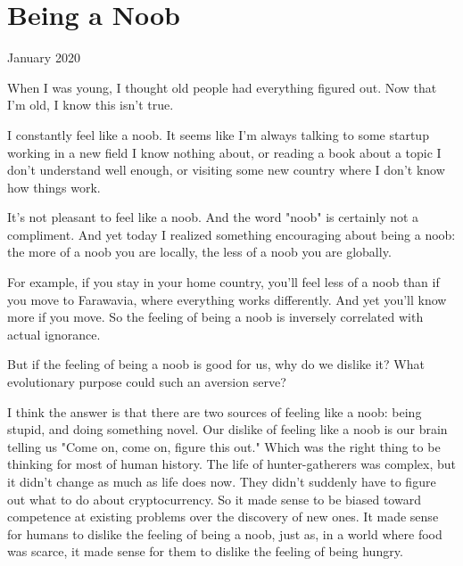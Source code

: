 \chapter{Being a Noob}


            
              
                

January 2020

When I was young, I thought old
                  people had everything figured out. Now that I'm old, I know
                  this isn't true.

I constantly feel like a noob. It
                  seems like I'm always talking to some startup working in a new
                  field I know nothing about, or reading a book about a topic I
                  don't understand well enough, or visiting some new country
                  where I don't know how things work.

It's not
                  pleasant to feel like a noob. And the word "noob" is certainly
                  not a compliment. And yet today I realized something
                  encouraging about being a noob: the more of a noob you are
                  locally, the less of a noob you are globally.

For
                  example, if you stay in your home country, you'll feel less of
                  a noob than if you move to Farawavia, where everything works
                  differently. And yet you'll know more if you move. So the
                  feeling of being a noob is inversely correlated with actual
                  ignorance.

But if the feeling of being a noob is
                  good for us, why do we dislike it? What evolutionary purpose
                  could such an aversion serve?

I think the answer is
                  that there are two sources of feeling like a noob: being
                  stupid, and doing something novel. Our dislike of feeling like
                  a noob is our brain telling us "Come on, come on, figure this
                  out." Which was the right thing to be thinking for most of
                  human history. The life of hunter-gatherers was complex, but
                  it didn't change as much as life does now. They didn't
                  suddenly have to figure out what to do about cryptocurrency.
                  So it made sense to be biased toward competence at existing
                  problems over the discovery of new ones. It made sense for
                  humans to dislike the feeling of being a noob, just as, in a
                  world where food was scarce, it made sense for them to dislike
                  the feeling of being hungry.

